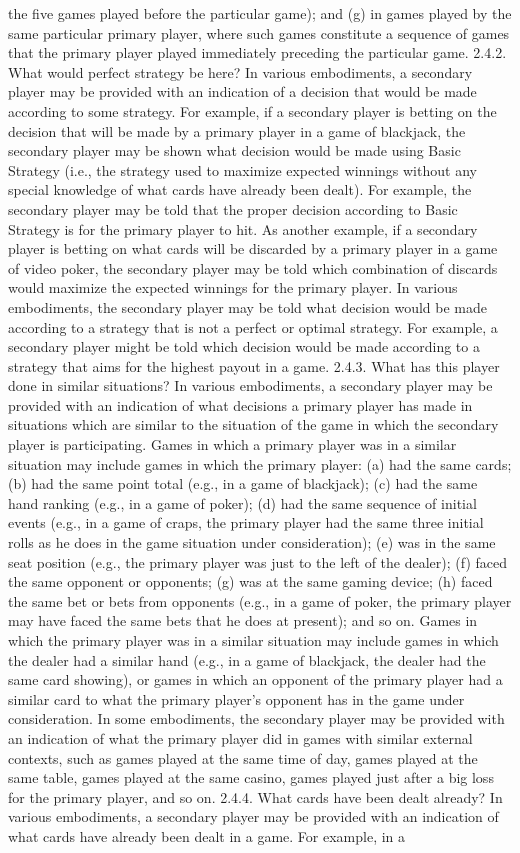 \documentclass[11pt,a4paper]{article}
\begin{document}
the five games played before the particular game); and (g) in games played by the same particular primary player, where such games constitute a sequence of games that the primary player played immediately preceding the particular game. 2.4.2. What would perfect strategy be here? In various embodiments, a secondary player may be provided with an indication of a decision that would be made according to some strategy. For example, if a secondary player is betting on the decision that will be made by a primary player in a game of blackjack, the secondary player may be shown what decision would be made using Basic Strategy (i.e., the strategy used to maximize expected winnings without any special knowledge of what cards have already been dealt). For example, the secondary player may be told that the proper decision according to Basic Strategy is for the primary player to hit. As another example, if a secondary player is betting on what cards will be discarded by a primary player in a game of video poker, the secondary player may be told which combination of discards would maximize the expected winnings for the primary player. In various embodiments, the secondary player may be told what decision would be made according to a strategy that is not a perfect or optimal strategy. For example, a secondary player might be told which decision would be made according to a strategy that aims for the highest payout in a game. 2.4.3. What has this player done in similar situations? In various embodiments, a secondary player may be provided with an indication of what decisions a primary player has made in situations which are similar to the situation of the game in which the secondary player is participating. Games in which a primary player was in a similar situation may include games in which the primary player: (a) had the same cards; (b) had the same point total (e.g., in a game of blackjack); (c) had the same hand ranking (e.g., in a game of poker); (d) had the same sequence of initial events (e.g., in a game of craps, the primary player had the same three initial rolls as he does in the game situation under consideration); (e) was in the same seat position (e.g., the primary player was just to the left of the dealer); (f) faced the same opponent or opponents; (g) was at the same gaming device; (h) faced the same bet or bets from opponents (e.g., in a game of poker, the primary player may have faced the same bets that he does at present); and so on. Games in which the primary player was in a similar situation may include games in which the dealer had a similar hand (e.g., in a game of blackjack, the dealer had the same card showing), or games in which an opponent of the primary player had a similar card to what the primary player's opponent has in the game under consideration. In some embodiments, the secondary player may be provided with an indication of what the primary player did in games with similar external contexts, such as games played at the same time of day, games played at the same table, games played at the same casino, games played just after a big loss for the primary player, and so on. 2.4.4. What cards have been dealt already? In various embodiments, a secondary player may be provided with an indication of what cards have already been dealt in a game. For example, in a 
\end{document}
